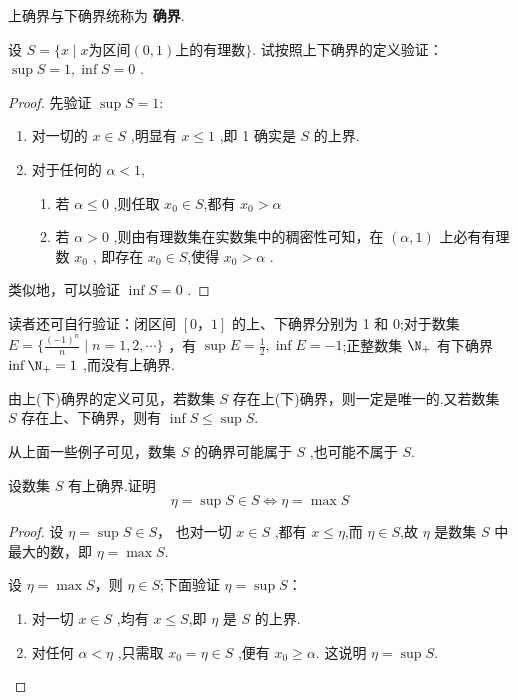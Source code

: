 上确界与下确界统称为 \textbf{确界}.

\begin{example}
    设 $S=\{ x \mid x \mbox{为区间} (0,1) \mbox{上的有理数} \}$. 试按照上下确界的定义验证： $\sup S =1,\inf S=0$ .
\end{example}

\begin{proof}
    \renewcommand{\theenumi}{\roman{enumi}}
    \renewcommand{\labelenumi}{\normalfont (\theenumi)}
    先验证 $\sup S=1$:
    \begin{enumerate}
        \item 对一切的 $x\in S$ ,明显有 $x\le 1$ ,即 1 确实是 $S$ 的上界.
        \item 对于任何的 $\alpha <1$, 
        \begin{enumerate}
            \item[\textbullet] 若 $\alpha \le 0$ ,则任取 $x_0 \in S$,都有 $x_0>\alpha$
            \item[\textbullet] 若 $\alpha>0$ ,则由有理数集在实数集中的稠密性可知，在 $(\alpha,1)$ 上必有有理数 $x_0$ , 即存在 $x_0 \in S$,使得 $x_0>\alpha$ .
        \end{enumerate}
    \end{enumerate}

    类似地，可以验证 $\inf S=0$ .
\end{proof}

读者还可自行验证：闭区间 $[0，1]$ 的上、下确界分别为 1 和 0;对于数集 $E=\{\frac{(-1)^n}{n} \mid n=1,2,\cdots\}$ ，有 $\sup E=\frac{1}{2},\inf E =-1$;正整数集 $\N_+$ 有下确界 $\inf \N_+=1$ ,而没有上确界.

\begin{annotation}
    由上(下)确界的定义可见，若数集 $S$ 存在上(下)确界，则一定是唯一的.又若数集 $S$ 存在上、下确界，则有 $\inf S \le \sup S$.
\end{annotation}
\begin{annotation}
    从上面一些例子可见，数集 $S$ 的确界可能属于 $S$ ,也可能不属于 $S$.
\end{annotation}

\begin{example}[确界与最值]
    设数集 $S$ 有上确界.证明
    \[
    \eta = \sup S \in S \iff \eta = \max S
    \]
\end{example}

\begin{proof}
    \renewcommand{\theenumi}{\roman{enumi}}
    \renewcommand{\labelenumi}{\normalfont (\theenumi)}
    \biyao 设 $\eta = \sup S \in S$， 也对一切 $x\in S$ ,都有 $x\le \eta$,而 $\eta\in S$,故 $\eta$ 是数集 $S$ 中最大的数，即 $\eta=\max S$.

    \chongfen 设 $\eta=\max S$，则 $\eta\in S$;下面验证 $\eta = \sup S$：
    \begin{enumerate}
        \item 对一切 $x \in S$ ,均有 $x\le S$,即 $\eta$ 是 $S$ 的上界.
        \item 对任何 $\alpha < \eta$ ,只需取 $x_0=\eta\in S$ ,便有 $x_0\ge \alpha$. 这说明 $\eta=\sup S$.
    \end{enumerate}
\end{proof}

